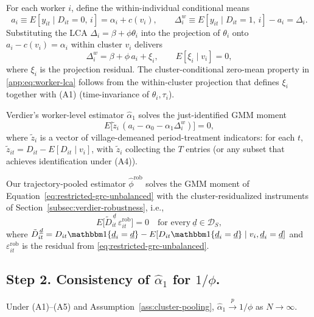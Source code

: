 For each worker $i$, define the within-individual conditional means
\[
a_i \equiv E[y_{it}\mid D_{it}=0,\,i] = \alpha_i + c(v_i),
\qquad
\Delta_i^w \equiv E[y_{it}\mid D_{it}=1,\,i] - a_i = \Delta_i.
\]
Substituting the LCA $\Delta_i = \beta + \phi\theta_i$ into the projection of $\theta_i$ onto $a_i - c(v_i) = \alpha_i$ within cluster $v_i$ delivers
\begin{equation}\label{app:eq:worker-lca}
\Delta_i^w = \beta + \phi\,a_i + \xi_i,
\qquad E[\xi_i \mid v_i] = 0,
\end{equation}
where $\xi_i$ is the projection residual.
The cluster-conditional zero-mean property in \eqref{app:eq:worker-lca} follows from the within-cluster projection that defines $\xi_i$ together with (A1) (time-invariance of $\theta_i,\tau_i$).

Verdier's worker-level estimator $\hat\alpha_1$ solves the just-identified GMM moment
\begin{equation}\label{app:eq:vv-moment}
E\!\big[\tilde z_i\,(a_i - \alpha_0 - \alpha_1 \Delta_i^w)\big] = 0,
\end{equation}
where $\tilde z_i$ is a vector of village-demeaned period-treatment indicators: for each $t$, $\tilde z_{it} = D_{it} - E[D_{it}\mid v_i]$, with $\tilde z_i$ collecting the $T$ entries (or any subset that achieves identification under (A4)).

Our trajectory-pooled estimator $\hat\phi^{\mathrm{rob}}$ solves the GMM moment of Equation~\eqref{eq:restricted-grc-unbalanced} with the cluster-residualized instruments of Section~\ref{subsec:verdier-robustness}, i.e.,
\begin{equation}\label{app:eq:rob-moment}
E\!\big[\tilde D_{it}^{\,\underline d}\,\varepsilon_{it}^{\mathrm{rob}}\big] = 0
\quad\text{for every}\ \underline d \in \mathcal D_S,
\end{equation}
where $\tilde D_{it}^{\,\underline d} = D_{it}\mathbbm 1\{\underline d_i = \underline d\} - E[D_{it}\mathbbm 1\{\underline d_i = \underline d\}\mid v_i,\underline d_i = \underline d]$ and $\varepsilon_{it}^{\mathrm{rob}}$ is the residual from \eqref{eq:restricted-grc-unbalanced}.

\subsection*{Step 2.  Consistency of $\hat\alpha_1$ for $1/\phi$.}

\begin{lemma}\label{app:lem:vv}
Under (A1)--(A5) and Assumption~\ref{ass:cluster-pooling}, $\hat\alpha_1 \xrightarrow{p} 1/\phi$ as $N \to \infty$.
\end{lemma}

